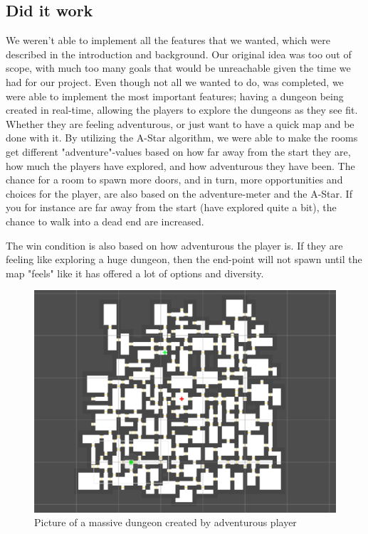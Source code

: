 \documentclass[conference,compsoc]{IEEEtran}
\begin{document}
\subsection{Did it work}
We weren't able to implement all the features that we wanted, which were described in the introduction and background. Our original idea was too out of scope, with much too many goals that would be unreachable given the time we had for our project. Even though not all we wanted to do, was completed, we were able to implement the most important features; having a dungeon being created in real-time, allowing the players to explore the dungeons as they see fit. Whether they are feeling adventurous, or just want to have a quick map and be done with it. 
By utilizing the A-Star algorithm, we were able to make the rooms get different "adventure"-values based on how far away from the start they are, how much the players have explored, and how adventurous they have been. The chance for a room to spawn more doors, and in turn, more opportunities and choices for the player, are also based on the adventure-meter and the A-Star. If you for instance are far away from the start (have explored quite a bit), the chance to walk into a dead end are increased.

The win condition is also based on how adventurous the player is. If they are feeling like exploring a huge dungeon, then the end-point will not spawn until the map "feels" like it has offered a lot of options and diversity.

\begin{figure}[h]
	\graphicspath{{figures/}}
	\includegraphics[width = \columnwidth ]{BigDungeon.png}
	\caption{Picture of a massive dungeon created by adventurous player}
	\label{fig:behavTree}
\end{figure}
\end{document}
